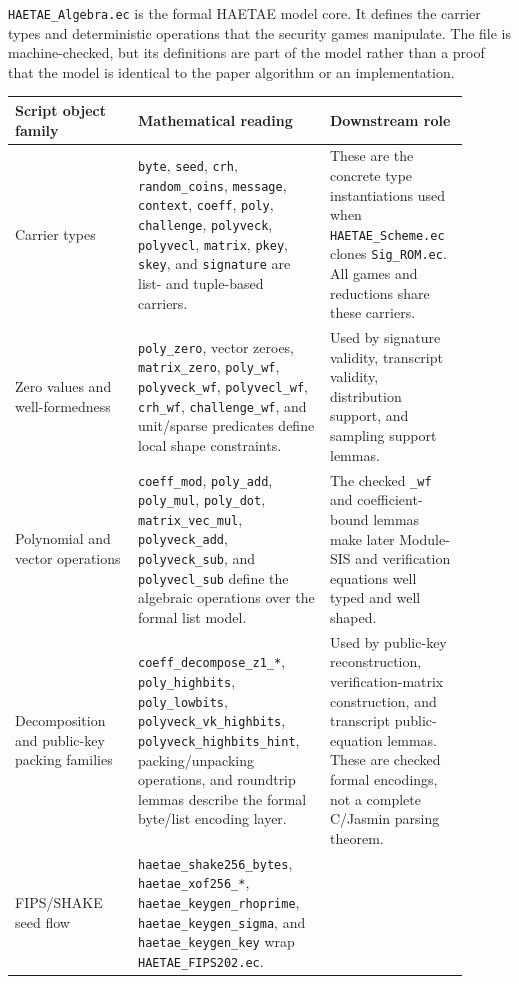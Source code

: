 \documentclass[11pt]{report}
\DeclareRobustCommand{\file}[1]{\ifmmode\text{\nolinkurl{#1}}\else\nolinkurl{#1}\fi}
\DeclareRobustCommand{\ec}[1]{\ifmmode\text{\nolinkurl{#1}}\else\nolinkurl{#1}\fi}
\theoremstyle{definition}
\theoremstyle{plain}
\begin{document}
\file{HAETAE\_Algebra.ec} is the formal HAETAE model core.  It defines the
carrier types and deterministic operations that the security games manipulate.
The file is machine-checked, but its definitions are part of the model rather
than a proof that the model is identical to the paper algorithm or an
implementation.

\begin{longtable}{p{0.25\linewidth}p{0.39\linewidth}p{0.26\linewidth}}
\toprule
\textbf{Script object family} & \textbf{Mathematical reading} & \textbf{Downstream role} \\
\midrule
Carrier types &
\ec{byte}, \ec{seed}, \ec{crh}, \ec{random\_coins}, \ec{message},
\ec{context}, \ec{coeff}, \ec{poly}, \ec{challenge}, \ec{polyveck},
\ec{polyvecl}, \ec{matrix}, \ec{pkey}, \ec{skey}, and \ec{signature} are
list- and tuple-based carriers. &
These are the concrete type instantiations used when
\file{HAETAE\_Scheme.ec} clones \file{Sig\_ROM.ec}.  All games and reductions
share these carriers. \\
\midrule
Zero values and well-formedness &
\ec{poly\_zero}, vector zeroes, \ec{matrix\_zero},
\ec{poly\_wf}, \ec{polyveck\_wf}, \ec{polyvecl\_wf},
\ec{crh\_wf}, \ec{challenge\_wf}, and unit/sparse predicates define local
shape constraints. &
Used by signature validity, transcript validity, distribution support, and
sampling support lemmas. \\
\midrule
Polynomial and vector operations &
\ec{coeff\_mod}, \ec{poly\_add}, \ec{poly\_mul}, \ec{poly\_dot},
\ec{matrix\_vec\_mul}, \ec{polyveck\_add}, \ec{polyveck\_sub}, and
\ec{polyvecl\_sub} define the algebraic operations over the formal list model. &
The checked \ec{\_wf} and coefficient-bound lemmas make later Module-SIS and
verification equations well typed and well shaped. \\
\midrule
Decomposition and public-key packing families &
\ec{coeff\_decompose\_z1\_*}, \ec{poly\_highbits},
\ec{poly\_lowbits}, \ec{polyveck\_vk\_highbits},
\ec{polyveck\_highbits\_hint}, packing/unpacking operations, and roundtrip
lemmas describe the formal byte/list encoding layer. &
Used by public-key reconstruction, verification-matrix construction, and
transcript public-equation lemmas.  These are checked formal encodings, not a
complete C/Jasmin parsing theorem. \\
\midrule
FIPS/SHAKE seed flow &
\ec{haetae\_shake256\_bytes}, \ec{haetae\_xof256\_*},
\ec{haetae\_keygen\_rhoprime}, \ec{haetae\_keygen\_sigma}, and
\ec{haetae\_keygen\_key} wrap \file{HAETAE\_FIPS202.ec}. &

\end{longtable}
\end{document}
